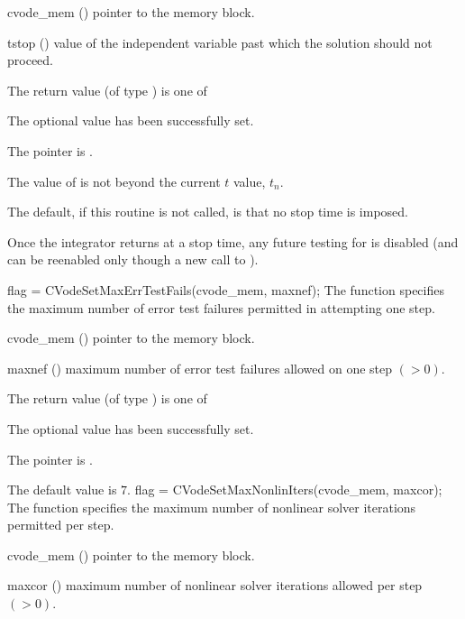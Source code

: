 {
  \begin{args}
  \item[cvode\_mem] ()
    pointer to the {\cvodes} memory block.
  \item[tstop] ()
    value of the independent variable past which the solution should
    not proceed.
  \end{args}
}
{
  The return value  (of type ) is one of
  \begin{args}
  \item[\Id{CV\_SUCCESS}]
    The optional value has been successfully set.
  \item[\Id{CV\_MEM\_NULL}]
    The  pointer is .
  \item[\Id{CV\_ILL\_INPUT}]
    The value of  is not beyond the current $t$ value, $t_n$.
  \end{args}
}
{
  The default, if this routine is not called, is that no stop time is imposed.

  Once the integrator returns at a stop time, any future testing for 
  is disabled (and can be reenabled only though a new call to ).
}
{
flag = CVodeSetMaxErrTestFails(cvode\_mem, maxnef);
}
{
  The function  specifies the
  maximum number of error test failures permitted in attempting one step.
}
{
  \begin{args}
  \item[cvode\_mem] ()
    pointer to the {\cvodes} memory block.
  \item[maxnef] ()
    maximum number of error test failures allowed on one step $( > 0)$.
  \end{args}
}
{
  The return value  (of type ) is one of
  \begin{args}
  \item[\Id{CV\_SUCCESS}]
    The optional value has been successfully set.
  \item[\Id{CV\_MEM\_NULL}]
    The  pointer is .
  \end{args}
}
{
  The default value is $7$.
}
{
flag = CVodeSetMaxNonlinIters(cvode\_mem, maxcor);
}
{
  The function  specifies the maximum
  number of nonlinear solver iterations permitted per step.
}
{
  \begin{args}
  \item[cvode\_mem] ()
    pointer to the {\cvodes} memory block.
  \item[maxcor] ()
    maximum number of nonlinear solver iterations allowed per step $( > 0)$.
  \end{args}
}

